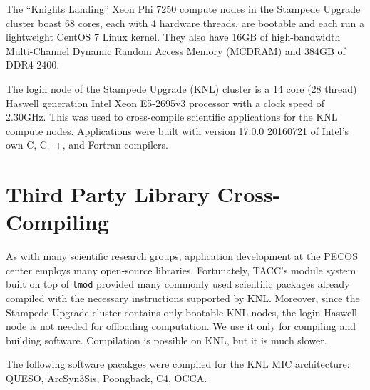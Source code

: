 The ``Knights Landing'' Xeon Phi 7250 compute nodes in the Stampede Upgrade
cluster boast 68 cores, each with 4 hardware threads, are bootable and each run
a lightweight CentOS 7 Linux kernel.  They also have 16GB of high-bandwidth
Multi-Channel Dynamic Random Access Memory (MCDRAM) and 384GB of DDR4-2400.

The login node of the Stampede Upgrade (KNL) cluster is a 14 core (28 thread)
Haswell generation Intel Xeon E5-2695v3 processor with a clock speed of
2.30GHz.  This was used to cross-compile scientific applications for the KNL
compute nodes.  Applications were built with version 17.0.0 20160721 of Intel's
own C, C++, and Fortran compilers.

\section{Third Party Library Cross-Compiling}
\label{sec:cross_compile}

As with many scientific research groups, application development at the PECOS
center employs many open-source libraries.  Fortunately, TACC's module system
built on top of \texttt{lmod} provided many commonly used scientific packages
already compiled with the necessary instructions supported by KNL.  Moreover,
since the Stampede Upgrade cluster contains only bootable KNL nodes, the login
Haswell node is not needed for offloading computation.  We use it only for
compiling and building software.  Compilation is possible on KNL, but it is
much slower.

The following software pacakges were compiled for the KNL MIC architecture:
QUESO, ArcSyn3Sis, Poongback, C4, OCCA.


%
%
%
%
